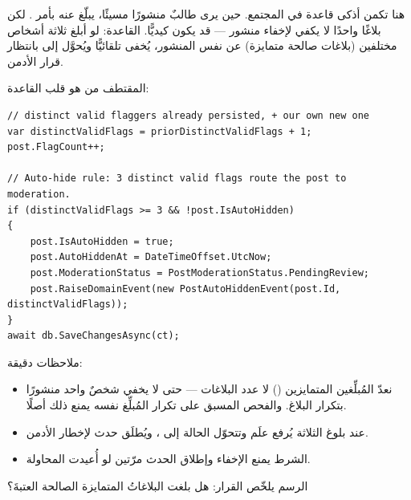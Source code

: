 هنا تكمن أذكى قاعدة في المجتمع. حين يرى طالبٌ منشورًا مسيئًا، يبلّغ عنه بأمر
. لكن بلاغًا واحدًا لا يكفي لإخفاء منشور — قد يكون كيديًّا. القاعدة:
لو أبلغ ثلاثة أشخاص مختلفين (بلاغات صالحة متمايزة) عن نفس المنشور، يُخفى تلقائيًّا
ويُحوَّل إلى  بانتظار قرار الأدمن.

المقتطف من  هو قلب القاعدة:

\begin{english}
\begin{lstlisting}[language={[Sharp]C}]
// distinct valid flaggers already persisted, + our own new one
var distinctValidFlags = priorDistinctValidFlags + 1;
post.FlagCount++;

// Auto-hide rule: 3 distinct valid flags route the post to moderation.
if (distinctValidFlags >= 3 && !post.IsAutoHidden)
{
    post.IsAutoHidden = true;
    post.AutoHiddenAt = DateTimeOffset.UtcNow;
    post.ModerationStatus = PostModerationStatus.PendingReview;
    post.RaiseDomainEvent(new PostAutoHiddenEvent(post.Id, distinctValidFlags));
}
await db.SaveChangesAsync(ct);
\end{lstlisting}
\end{english}

ملاحظات دقيقة:
\begin{itemize}
\item نعدّ المُبلِّغين المتمايزين () لا عدد البلاغات — حتى لا يخفي
  شخصٌ واحد منشورًا بتكرار البلاغ. والفحص المسبق على تكرار المُبلِّغ نفسه يمنع ذلك أصلًا.
\item عند بلوغ الثلاثة يُرفع علَم  وتتحوّل الحالة إلى ،
  ويُطلَق حدث  لإخطار الأدمن.
\item الشرط  يمنع الإخفاء وإطلاق الحدث مرّتين لو أُعيدت المحاولة.
\end{itemize}

الرسم يلخّص القرار: هل بلغت البلاغاتُ المتمايزة الصالحة العتبةَ؟

\begin{center}
\begin{LTR}
\end{LTR}
\end{center}

